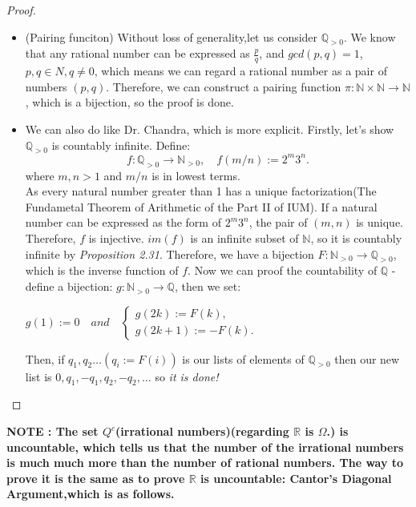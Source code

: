 \documentclass[a4paper]{article}
\begin{document}
\begin{proof}
\begin{itemize}
    \item (Pairing funciton) Without loss of generality,let us consider $\mathbb{Q}_{>0}$. We know that any rational number can be expressed as $\frac{p}{q}$, and $gcd(p,q)=1$, $p,q\in N, q\neq 0$, which means we can regard a rational number as a pair of numbers $(p,q)$. Therefore, we can construct a pairing function $\pi: \mathbb{N} \times \mathbb{N} \rightarrow \mathbb{N}$, which is a bijection, so the proof is done.
    \item We can also do like Dr. Chandra, which is more explicit.
          Firstly, let's show $\mathbb{Q}_{>0}$ is countably infinite. Define: 
          \begin{equation*}
          f:\mathbb{Q}_{>0}\rightarrow\mathbb{N}_{>0}, \quad f(m/n):=2^m3^n.
          \end{equation*}
          where $m,n>1$ and $m/n$ is in lowest terms. \\
          As every natural number greater than 1 has a unique factorization(The Fundametal Theorem of Arithmetic of the Part II of IUM). If a natural number can be expressed as the form of $2^m3^n$, the pair of $(m,n)$ is unique. Therefore, $f$ is injective.
          $im(f)$ is an infinite subset of $\mathbb{N}$, so it is countably infinite by \emph{Proposition 2.31}. Therefore, we have a bijection $F:\mathbb{N}_{>0}\rightarrow\mathbb{Q}_{>0}$, which is the inverse function of $f$.
          Now we can proof the countability of $\mathbb{Q}$ - define a bijection: $g:\mathbb{N}_{>0}\rightarrow\mathbb{Q}$, then we set:
          \begin{center}
            $g(1):=0 \quad and \quad \begin{cases} 
                                     g(2k):=F(k),\\ 
                                     g(2k+1):=-F(k).
                                     \end{cases}$
          \end{center}
          Then, if $q_1,q_2\ldots(q_i:=F(i))$ is our lists of elements of $\mathbb{Q}_{>0}$ then our new list is $0,q_1,-q_1,q_2,-q_2,\ldots$ so \textit{it is done!}
        \end{itemize}
\end{proof}
\textbf{NOTE : The set $Q^c$(irrational numbers)(regarding $\mathbb{R}$ is $\Omega$.) is uncountable, which tells us that the number of the irrational numbers is much much more than the number of rational numbers. The way to prove it is the same as to prove $\mathbb{R}$ is uncountable: Cantor's Diagonal Argument,which is as follows.}
\end{document}
